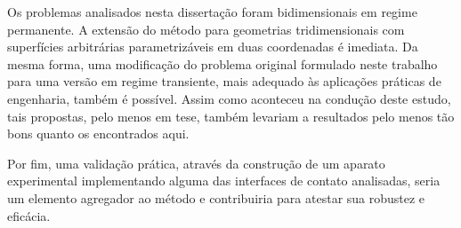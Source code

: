 Os problemas analisados nesta dissertação foram bidimensionais em regime permanente. A extensão do método para geometrias tridimensionais com superfícies arbitrárias parametrizáveis em duas coordenadas é imediata. Da mesma forma, uma modificação do problema original formulado neste trabalho para uma versão em regime transiente, mais adequado às aplicações práticas de engenharia, também é possível. Assim como aconteceu na condução deste estudo, tais propostas, pelo menos em tese, também levariam a resultados pelo menos tão bons quanto os encontrados aqui.

Por fim, uma validação prática, através da construção de um aparato experimental implementando alguma das interfaces de contato analisadas, seria um elemento agregador ao método e contribuiria para atestar sua robustez e eficácia.